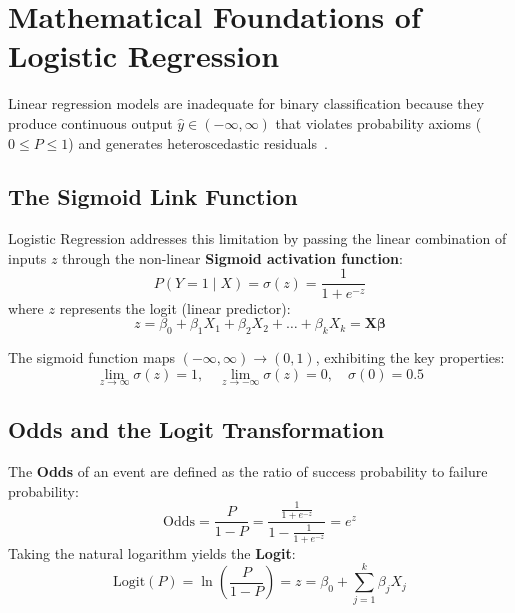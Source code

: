 \documentclass[11pt,a4paper]{article}
\begin{document}
\section{Mathematical Foundations of Logistic Regression}
\label{sec:math}
Linear regression models are inadequate for binary classification because they produce continuous output $\hat{y} \in (-\infty, \infty)$ that violates probability axioms ($0 \leq P \leq 1$) and generates heteroscedastic residuals~\cite{hosmer2013applied}.

\subsection{The Sigmoid Link Function}
Logistic Regression addresses this limitation by passing the linear combination of inputs $z$ through the non-linear \textbf{Sigmoid activation function}:
\begin{equation}
    P(Y = 1 \mid X) = \sigma(z) = \frac{1}{1 + e^{-z}}
    \label{eq:sigmoid}
\end{equation}
where $z$ represents the logit (linear predictor):
\begin{equation}
    z = \beta_0 + \beta_1 X_1 + \beta_2 X_2 + \dots + \beta_k X_k = \mathbf{X}\boldsymbol{\beta}
    \label{eq:logit_lin}
\end{equation}

The sigmoid function maps $(-\infty, \infty) \to (0, 1)$, exhibiting the key properties:
\begin{equation}
    \lim_{z \to \infty} \sigma(z) = 1, \quad \lim_{z \to -\infty} \sigma(z) = 0, \quad \sigma(0) = 0.5
\end{equation}

\subsection{Odds and the Logit Transformation}
The \textbf{Odds} of an event are defined as the ratio of success probability to failure probability:
\begin{equation}
    \text{Odds} = \frac{P}{1 - P} = \frac{\frac{1}{1 + e^{-z}}}{1 - \frac{1}{1 + e^{-z}}} = e^z
\end{equation}
Taking the natural logarithm yields the \textbf{Logit}:
\begin{equation}
    \text{Logit}(P) = \ln\left(\frac{P}{1 - P}\right) = z = \beta_0 + \sum_{j=1}^k \beta_j X_j
\end{equation}
\end{document}
